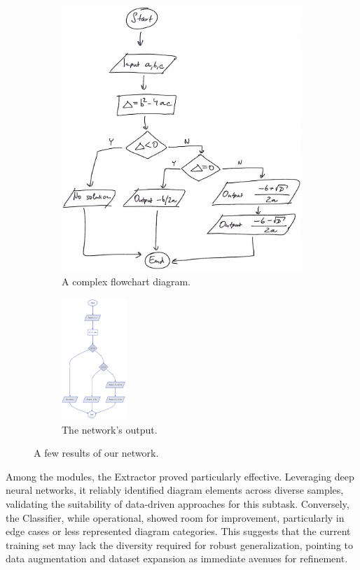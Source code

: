 \documentclass[conference]{IEEEtran}
\begin{document}
\begin{figure}[htbp]
	\begin{subfigure}[b]{0.45\linewidth}
		\includegraphics[width=\linewidth]{ex5.png}
		\caption{A complex flowchart diagram.}
	\end{subfigure}
	\hfill
	\begin{subfigure}[b]{0.45\linewidth}
		\includegraphics[width=70pt, height=130pt]{ex6.png}
		\caption{The network's output.}
	\end{subfigure}
	
	\caption{A few results of our network.}
	\label{fig:results}
\end{figure}

Among the modules, the Extractor proved particularly effective. Leveraging deep neural networks, it reliably identified diagram elements across diverse samples, validating the suitability of data-driven approaches for this subtask. Conversely, the Classifier, while operational, showed room for improvement, particularly in edge cases or less represented diagram categories. This suggests that the current training set may lack the diversity required for robust generalization, pointing to data augmentation and dataset expansion as immediate avenues for refinement.
\end{document}
